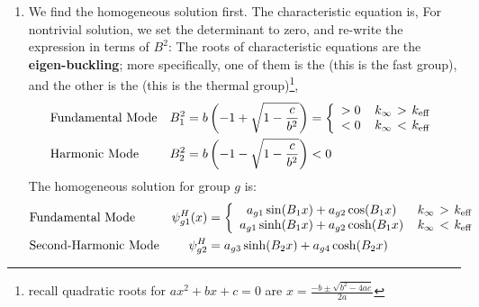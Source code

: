 \documentclass{school-22.211-notes}
\begin{document}
\begin{enumerate}
\item We find the homogeneous solution first. The characteristic equation is, 
    For nontrivial solution, we set the determinant to zero, and re-write the expression in terms of $B^2$: 
    The roots of characteristic equations are the \textbf{eigen-buckling}; more specifically, one of them is the  (this is the fast group), and the other is the  (this is the thermal group)\footnote{recall quadratic roots for $ax^2 + bx + c = 0$ are $x = \frac{-b \pm \sqrt{b^2 - 4ac}}{2a}$}, 
    \begin{align}
      &\mbox{Fundamental Mode} &B_1^2&= b\left(-1 + \sqrt{1 - \frac{c}{b^2}} \right) = \left\{ \begin{array}{cc} > 0 & \left. k_{\infty} \right. > \left. k_{\mathrm{eff}} \right. \\ < 0 & \left. k_{\infty} \right. < \left. k_{\mathrm{eff}} \right. \end{array} \right. \\
      &\mbox{Harmonic Mode} &B_2^2&=b\left(-1 - \sqrt{1 - \frac{c}{b^2}} \right) <0
    \end{align}
    The homogeneous solution for group $g$ is: 
     \begin{align}
      &\mbox{Fundamental Mode} &\psi_{g1}^H(x)&= \left\{ \begin{array}{cc} a_{g1} \sin(B_1 x) + a_{g2} \cos(B_1x) & \kinf > \keff \\ a_{g1} \sinh(B_1 x) + a_{g2} \cosh(B_1 x) & \kinf < \keff \end{array} \right. \\
      &\mbox{Second-Harmonic Mode} &\psi_{g2}^H&=a_{g3} \sinh(B_2 x) + a_{g4} \cosh(B_2 x) 

\end{align}
\end{enumerate}
\end{document}
